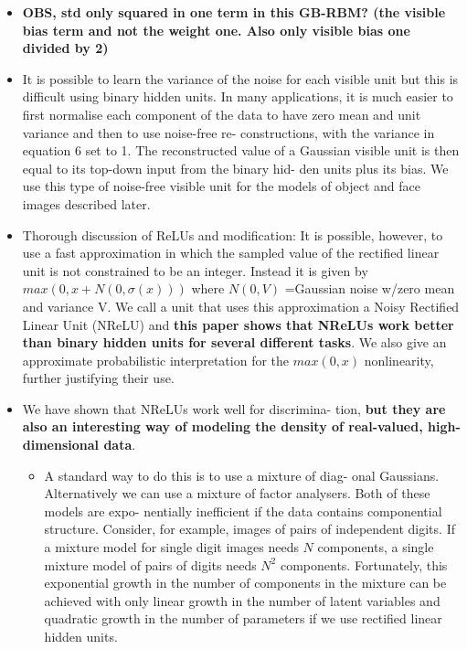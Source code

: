 \documentclass[twoside,english]{uiofysmaster}
\begin{document}
\begin{itemize}
\begin{itemize}
	\end{itemize}
	\item \textbf{OBS, std only squared in one term in this GB-RBM? (the visible bias term and not the weight one. Also only visible bias one divided by 2)}
	\item It is possible to learn the variance of the noise for each visible unit but this is difficult using binary hidden units. In many applications, it is much easier to first normalise each component of the data to have zero mean and unit variance and then to use noise-free re- constructions, with the variance in equation 6 set to 1. The reconstructed value of a Gaussian visible unit is then equal to its top-down input from the binary hid- den units plus its bias. We use this type of noise-free visible unit for the models of object and face images described later.
	\item Thorough discussion of ReLUs and modification: It is possible, however, to use a fast approximation in which the sampled value of the rectified linear unit is not constrained to be an integer. Instead it is given by $max(0, x+N(0, \sigma(x)))$ where $N(0, V)$ =Gaussian noise w/zero mean and variance V. We call a unit that uses this approximation a Noisy Rectified Linear Unit (NReLU) and \textbf{this paper shows that NReLUs work better than binary hidden units for several different tasks}. We also give an approximate probabilistic interpretation for the $max(0,x)$ nonlinearity, further justifying their use.
	\item We have shown that NReLUs work well for discrimina- tion, \textbf{but they are also an interesting way of modeling the density of real-valued, high-dimensional data}.
	\begin{itemize}
		\item A standard way to do this is to use a mixture of diag- onal Gaussians. Alternatively we can use a mixture of factor analysers. Both of these models are expo- nentially inefficient if the data contains componential structure. Consider, for example, images of pairs of independent digits. If a mixture model for single digit images needs $N$ components, a single mixture model of pairs of digits needs $N^2$ components. Fortunately, this exponential growth in the number of components in the mixture can be achieved with only linear growth in the number of latent variables and quadratic growth in the number of parameters if we use rectified linear hidden units.

\end{itemize}
\end{itemize}
\end{document}
